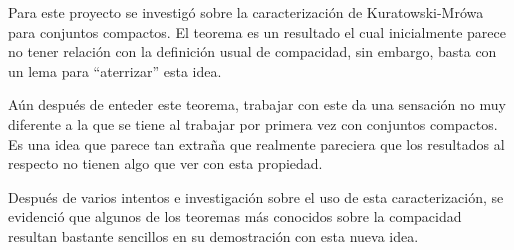 Para este proyecto se investigó sobre la caracterización
de Kuratowski-Mrówa para conjuntos compactos. El teorema
es un resultado el cual inicialmente parece no tener relación
con la definición usual de compacidad, sin embargo,
basta con un lema para ``aterrizar'' esta idea.

Aún después de enteder este teorema, trabajar con este
da una sensación no muy diferente a la que se tiene al trabajar
por primera vez con conjuntos compactos. Es una idea
que parece tan extraña que realmente pareciera que
los resultados al respecto no tienen algo que ver
con esta propiedad.

Después de varios intentos e investigación sobre
el uso de esta caracterización, se evidenció que
algunos de los teoremas más conocidos
sobre la compacidad resultan bastante sencillos en su
demostración con esta nueva idea.
